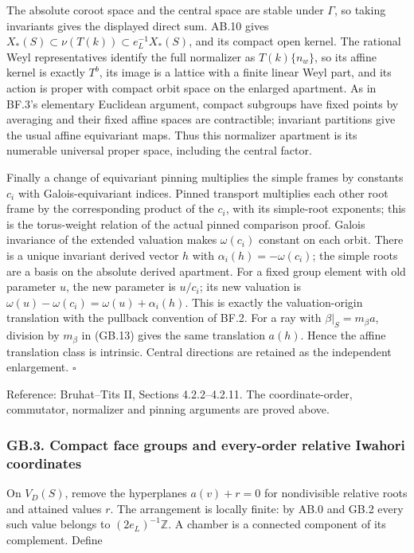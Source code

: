 \documentclass[
  11pt,
]{article}
\begin{document}
The absolute coroot space and the central space are stable under
\(\Gamma\), so taking invariants gives the displayed direct sum. AB.10
gives \(X_*(S)\subset\nu(T(k))\subset e_L^{-1}X_*(S)\), and its compact
open kernel. The rational Weyl representatives identify the full
normalizer as \(T(k)\{n_w\}\), so its affine kernel is exactly \(T^b\),
its image is a lattice with a finite linear Weyl part, and its action is
proper with compact orbit space on the enlarged apartment. As in BF.3's
elementary Euclidean argument, compact subgroups have fixed points by
averaging and their fixed affine spaces are contractible; invariant
partitions give the usual affine equivariant maps. Thus this normalizer
apartment is its numerable universal proper space, including the central
factor.

Finally a change of equivariant pinning multiplies the simple frames by
constants \(c_i\) with Galois-equivariant indices. Pinned transport
multiplies each other root frame by the corresponding product of the
\(c_i\), with its simple-root exponents; this is the torus-weight
relation of the actual pinned comparison proof. Galois invariance of the
extended valuation makes \(\omega(c_i)\) constant on each orbit. There
is a unique invariant derived vector \(h\) with
\(\alpha_i(h)=-\omega(c_i)\); the simple roots are a basis on the
absolute derived apartment. For a fixed group element with old parameter
\(u\), the new parameter is \(u/c_i\); its new valuation is
\(\omega(u)-\omega(c_i)=\omega(u)+\alpha_i(h)\). This is exactly the
valuation-origin translation with the pullback convention of BF.2. For a
ray with \(\beta|_S=m_\beta a\), division by \(m_\beta\) in (GB.13)
gives the same translation \(a(h)\). Hence the affine translation class
is intrinsic. Central directions are retained as the independent
enlargement. \(\square\)

Reference: Bruhat--Tits II, Sections 4.2.2--4.2.11. The
coordinate-order, commutator, normalizer and pinning arguments are
proved above.

\subsubsection{GB.3. Compact face groups and every-order relative
Iwahori
coordinates}\label{gb.3.-compact-face-groups-and-every-order-relative-iwahori-coordinates}

On \(V_D(S)\), remove the hyperplanes \(a(v)+r=0\) for nondivisible
relative roots and attained values \(r\). The arrangement is locally
finite: by AB.0 and GB.2 every such value belongs to
\((2e_L)^{-1}\mathbb Z\). A chamber is a connected component of its
complement. Define
\end{document}
